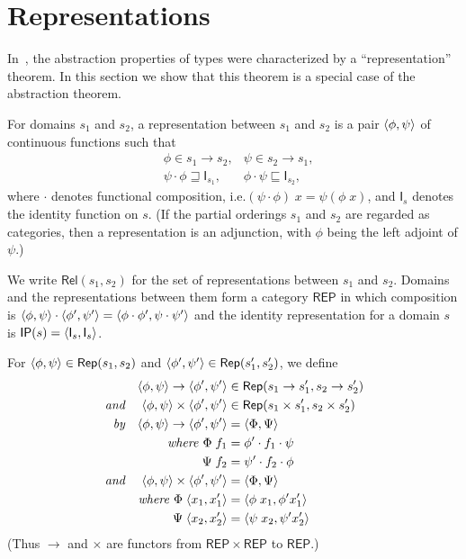 \documentclass[sigplan,screen,nonacm,balance=false]{acmart}
\makeatletter
\theoremstyle{plain}
\DeclarePairedDelimiter{\pair}{\langle}{\rangle}
\newcommand{\ie}{i.e.\@\xspace}
\newcommand{\Rel}{\mathsf{Rel}}
\newcommand{\Id}{\mathsf{I}}
\newcommand{\Rep}{\mathsf{Rep}}
\newcommand{\REP}{\mathsf{REP}}
\newcommand{\IP}{\mathsf{IP}}
\makeatother
\begin{document}
\section{Representations}

In~\citep{polymorphism}, the abstraction properties of types were characterized by a ``representation'' theorem.
In this section we show that this theorem is a special case of the abstraction theorem.

For domains $s_1$ and $s_2$, a representation between $s_1$ and $s_2$ is a pair $\pair{\phi, \psi}$ of continuous functions such that
%
\begin{align*}
  & \phi \in s_1 \to s_2, & \psi \in s_2 \to s_1, \\
  & \psi \cdot \phi \sqsupseteq \Id_{s_1}, & \phi \cdot \psi \sqsubseteq \Id_{s_2},
\end{align*}
%
where $\cdot$ denotes functional composition, \ie $(\psi \cdot \phi) \; x = \psi(\phi \; x)$, and $\Id_s$ denotes the identity function on $s$.
(If the partial orderings $s_1$ and $s_2$ are regarded as categories, then a representation is an adjunction, with $\phi$ being the left adjoint of $\psi$.)

We write $\Rel(s_1, s_2)$ for the set of representations between $s_1$ and $s_2$.
Domains and the representations between them form a category $\REP$ in which composition is $\pair{\phi, \psi} \cdot \pair{\phi', \psi'} = \pair{\phi \cdot \phi', \psi \cdot \psi'}$ and the identity representation for a domain $s$ is $\IP(s) = \pair{\Id_s, \Id_s}$.

For $\pair{\phi, \psi} \in \Rep(s_1, s_2)$ and $\pair{\phi', \psi'} \in \Rep(s'_1, s'_2)$, we define
%
\begin{align*}
  && \pair{\phi, \psi} \to \pair{\phi', \psi'} &\in \Rep(s_1 \to s'_1, s_2 \to s'_2) \\
  \textit{and} && \pair{\phi, \psi} \times \pair{\phi', \psi'} &\in \Rep(s_1 \times s'_1, s_2 \times s'_2) \\
  \textit{by} && \pair{\phi, \psi} \to \pair{\phi', \psi'} &= \pair{\Phi, \Psi} \\
  && \textit{where } \Phi \; f_1 &= \phi' \cdot f_1 \cdot \psi \\
  && \Psi \; f_2 &= \psi' \cdot f_2 \cdot \phi \\
  \textit{and} && \pair{\phi, \psi} \times \pair{\phi', \psi'} &= \pair{\Phi, \Psi} \\
  && \textit{where } \Phi \; \pair{x_1, x'_1} &= \pair{\phi \; x_1, \phi' x'_1} \\
  && \Psi \; \pair{x_2, x'_2} &= \pair{\psi \; x_2, \psi' x'_2}
\end{align*}
%
(Thus $\to$ and $\times$ are functors from $\REP \times \REP$ to $\REP$.)
\end{document}
